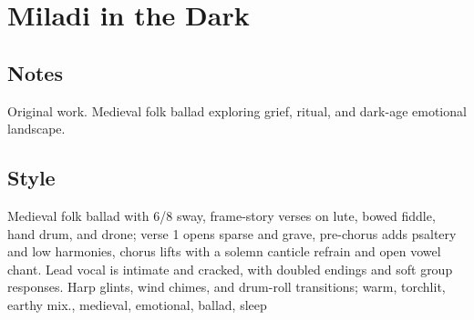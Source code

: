 \section{Miladi in the Dark}

\subsection{Notes}
Original work.
Medieval folk ballad exploring grief, ritual, and dark-age emotional landscape.

\subsection{Style}
Medieval folk ballad with 6/8 sway, frame-story verses on lute, bowed fiddle, hand drum, and drone; verse 1 opens sparse and grave, pre-chorus adds psaltery and low harmonies, chorus lifts with a solemn canticle refrain and open vowel chant. Lead vocal is intimate and cracked, with doubled endings and soft group responses. Harp glints, wind chimes, and drum-roll transitions; warm, torchlit, earthy mix., medieval, emotional, ballad, sleep

